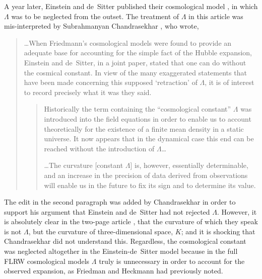 A year later, Einstein and de~Sitter published their cosmological model \cite{Einstein1932}, in which $\Lambda$ was to be neglected from the outset. The treatment of $\Lambda$ in this article was mis-interpreted by Subrahmanyan Chandrasekhar \cite{Chandrasekhar1983}, who wrote,
\begin{quote}
\ldots When Friedmann's cosmological models were found to provide an adequate base for accounting for the simple fact of the Hubble expansion, Einstein and de~Sitter, in a joint paper, stated that one can do without the cosmical constant. In view of the many exaggerated statements that have been made concerning this supposed `retraction' of $\Lambda$, it is of interest to record precisely what it was they said.
\begin{quotation}
Historically the term containing the ``cosmological constant'' $\Lambda$ was introduced into the field equations in order to enable us to account theoretically for the existence of a finite mean density in a static universe. It now appears that in the dynamical case this end can be reached without the introduction of $\Lambda$\ldots

\ldots The curvature [constant $\Lambda$] is, however, essentially determinable, and an increase in the precision of data derived from observations will enable us in the future to fix its sign and to determine its value.
\end{quotation}
\end{quote}
The edit in the second paragraph was added by Chandrasekhar in order to support his argument that Einstein and de~Sitter had not rejected $\Lambda$. However, it is absolutely clear in the two-page article \cite{Einstein1932}, that the curvature of which they speak is not $\Lambda$, but the curvature of three-dimensional space, $K$; and it is shocking that Chandrasekhar did not understand this. Regardless, the cosmological constant was neglected altogether in the Einstein-de~Sitter model because in the full FLRW cosmological models $\Lambda$ truly is unnecessary in order to account for the observed expansion, as Friedman and Heckmann had previously noted.

